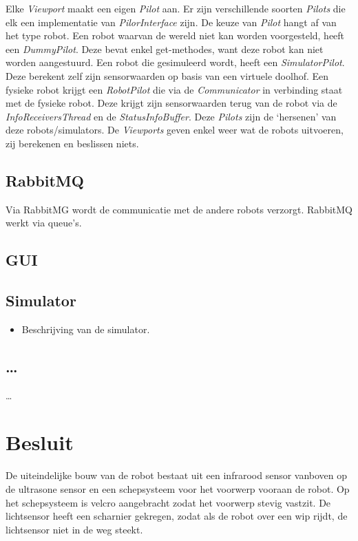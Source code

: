 \documentclass[tt1]{penoverslag}
\begin{document}
Elke \textit{Viewport} maakt een eigen \textit{Pilot} aan. Er zijn verschillende soorten \textit{Pilots} die elk een implementatie van \textit{PilorInterface} zijn. De keuze van \textit{Pilot} hangt af van het type robot. Een robot waarvan de wereld niet kan worden voorgesteld, heeft een \textit{DummyPilot}. Deze bevat enkel get-methodes, want deze robot kan niet worden aangestuurd. Een robot die gesimuleerd wordt, heeft een \textit{SimulatorPilot}. Deze berekent zelf zijn sensorwaarden op basis van een virtuele doolhof. Een fysieke robot krijgt een \textit{RobotPilot} die via de \textit{Communicator} in verbinding staat met de fysieke robot. Deze krijgt zijn sensorwaarden terug van de robot via de \textit{InfoReceiversThread} en de \textit{StatusInfoBuffer}. Deze \textit{Pilots} zijn de `hersenen' van deze robots/simulators. De \textit{Viewports} geven enkel weer wat de robots uitvoeren, zij berekenen en beslissen niets.

\subsection{RabbitMQ}
\label{secc:RabbMQ}
Via RabbitMG wordt de communicatie met de andere robots verzorgt. RabbitMQ werkt via queue's. %

\subsection{GUI}


\subsection{Simulator}
\begin{itemize}
\item Beschrijving van de simulator.
\end{itemize}



\subsection{\ldots}
\ldots


\section{Besluit}
De uiteindelijke bouw van de robot bestaat uit een infrarood sensor vanboven op de ultrasone sensor en een schepsysteem voor het voorwerp vooraan de robot. Op het schepsysteem is velcro aangebracht zodat het voorwerp stevig vastzit. De lichtsensor heeft een scharnier gekregen, zodat als de robot over een wip rijdt, de lichtsensor niet in de weg steekt. 
\end{document}
